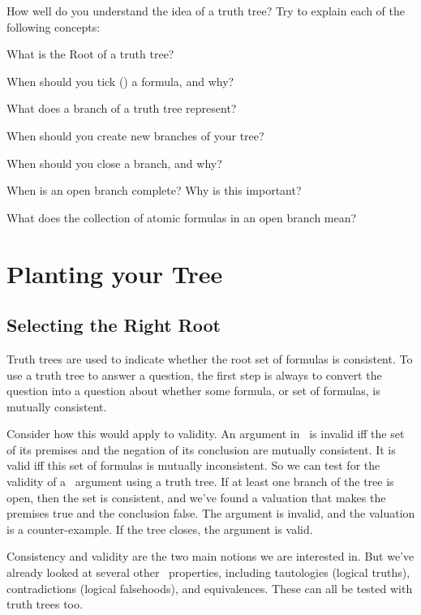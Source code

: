 \documentclass[PHIL101-Textbook.tex]{subfiles}
\begin{document}
\pagebreak
\practiceproblems

\noindent\solutions
\problempart \label{pr.tfl.ttreeconcepts}
How well do you understand the idea of a truth tree? Try to explain each of the following concepts:

\begin{earg}
\item What is the Root of a truth tree?
\item When should you tick (\checkmark) a formula, and why?
\item What does a branch of a truth tree represent?
\item When should you create new branches of your tree?
\item When should you close a branch, and why?
\item When is an open branch complete? Why is this important?
\item What does the collection of atomic formulas in an open branch mean?
\end{earg}


\chapter{Planting your Tree}\label{ch:tfl.tree.planting}
\section{Selecting the Right Root}

Truth trees are used to indicate whether the root set of formulas is consistent. To use a truth tree to answer a question, the first step is always to convert the question into a question about whether some formula, or set of formulas, is mutually consistent. 

Consider how this would apply to validity. An argument in \tfl\ is invalid iff the set of its premises and the negation of its conclusion are mutually consistent. It is valid iff this set of formulas is mutually inconsistent. So we can test for the validity of a \tfl\ argument using a truth tree.
If at least one branch of the tree is open, then the set is consistent, and we've found a valuation that makes the premises true and the conclusion false. The argument is invalid, and the valuation is a counter-example. If the tree closes, the argument is valid.

Consistency and validity are the two main notions we are interested in. But we've already looked at several other \tfl\ properties, including tautologies (logical truths), contradictions (logical falsehoods), and equivalences. These can all be tested with truth trees too.
\end{document}
